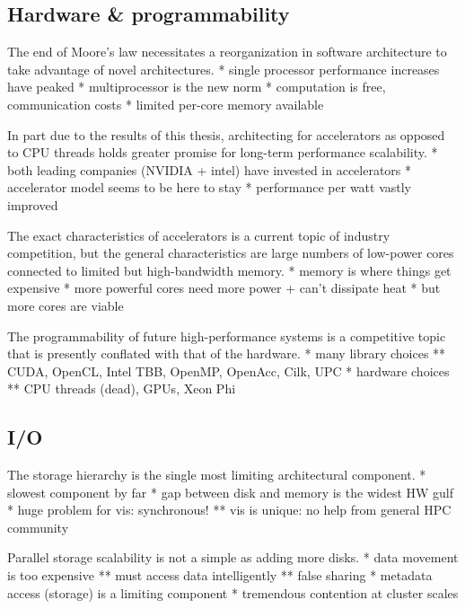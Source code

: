 \subsection{Hardware \& programmability}

The end of Moore's law necessitates a reorganization in software architecture
to take advantage of novel architectures.
	* single processor performance increases have peaked
	* multiprocessor is the new norm
	* computation is free, communication costs
	* limited per-core memory available

In part due to the results of this thesis, architecting for
accelerators as opposed to CPU threads holds greater promise for
long-term performance scalability.
	* both leading companies (NVIDIA + intel) have invested in accelerators
	* accelerator model seems to be here to stay
	* performance per watt vastly improved

The exact characteristics of accelerators is a current topic of
industry competition, but the general characteristics are large numbers
of low-power cores connected to limited but high-bandwidth memory.
	* memory is where things get expensive
	* more powerful cores need more power + can't dissipate heat
	* but more cores are viable

The programmability of future high-performance systems is a competitive
topic that is presently conflated with that of the hardware.
	* many library choices
	** CUDA, OpenCL, Intel TBB, OpenMP, OpenAcc, Cilk, UPC
	* hardware choices
	** CPU threads (dead), GPUs, Xeon Phi


\subsection{I/O}

The storage hierarchy is the single most limiting architectural
component.
	* slowest component by far
	* gap between disk and memory is the widest HW gulf
	* huge problem for vis: synchronous!
	** vis is unique: no help from general HPC community

Parallel storage scalability is not a simple as adding more disks.
	* data movement is too expensive
	** must access data intelligently
	** false sharing
	* metadata access (storage) is a limiting component
	* tremendous contention at cluster scales

